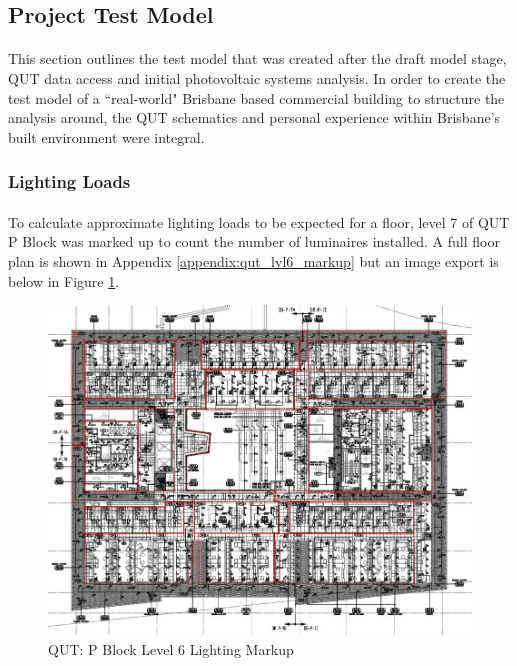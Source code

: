 
\subsection{Project Test Model} \label{section:project-model}

\paragraph{}
This section outlines the test model that was created after the draft model stage, QUT data access and initial photovoltaic systems analysis. In order to create the test model of a ``real-world" Brisbane based commercial building to structure the analysis around, the QUT schematics and personal experience within Brisbane's built environment were integral. 

\subsubsection{Lighting Loads}

\paragraph{}
To calculate approximate lighting loads to be expected for a floor, level 7 of QUT P Block was marked up to count the number of luminaires installed. A full floor plan is shown in Appendix \ref{appendix:qut_lvl6_markup} but an image export is below in Figure \ref{fig:qut-lvl6-lighting-markup}.      

\begin{figure}[H]
	\hfill\includegraphics[width = 150mm]{images/project-model/qut-lvl7-lighting-markup}\hspace*{\fill}
	\caption{QUT: P Block Level 6 Lighting Markup} 
	\label{fig:qut-lvl6-lighting-markup}
\end{figure}

